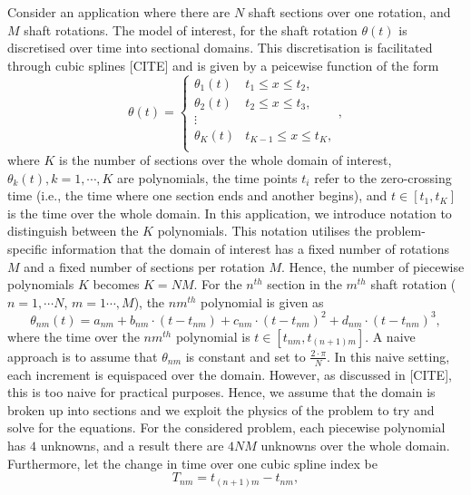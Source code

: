 \documentclass{article}
\begin{document}
	Consider an application where there are $N$ shaft sections over one rotation, and $M$ shaft rotations. The model of interest, for the shaft rotation $\theta(t)$ is discretised over time into sectional domains. This discretisation is facilitated through cubic splines [CITE] and is given by a peicewise function of the form
	\begin{equation}
		\theta(t) = \begin{cases} 
			\theta_{1}(t) &  t_{1} \leq x \leq t_2, \\
			\theta_{2}(t) &  t_{2} \leq x \leq t_3, \\
			\vdots \\
			\theta_{K}(t) &  t_{K-1} \leq x \leq t_K, \\
		\end{cases},
	\end{equation}
	where $K$ is the number of sections over the whole domain of interest, $\theta_{k}(t), k = 1, \cdots, K$ are polynomials, the time points $t_i$ refer to the zero-crossing time (i.e., the time where one section ends and another begins), and $t \in [t_1, t_K]$ is the time over the whole domain. In this application, we introduce notation to distinguish between the $K$ polynomials. This notation utilises the problem-specific information that the domain of interest has a fixed number of rotations $M$ and a fixed number of sections per rotation $M$. Hence, the number of piecewise polynomials $K$ becomes $K = NM$. For the $n^{th}$ section in the $m^{th}$ shaft rotation ($n = 1, \cdots N$, $m = 1 \cdots, M$), the $nm^{th}$ polynomial is given as
	\begin{equation}
		\theta_{nm}(t) = a_{nm} + b_{nm} \cdot \left(t - t_{nm} \right) + c_{nm} \cdot \left(t - t_{nm} \right)^2 + d_{nm} \cdot \left( t - t_{nm}\right)^3,
	\end{equation}
	where the time over the $nm^{th}$ polynomial is $t \in [t_{nm}, t_{(n + 1)m}]$. A naive approach is to assume that $\theta_{nm}$ is constant and set to $\frac{2\cdot\pi}{N}$. In this naive setting, each increment is equispaced over the domain. However, as discussed in [CITE], this is too naive for practical purposes. Hence, we assume that the domain is broken up into sections and we exploit the physics of the problem to try and solve for the equations. For the considered problem, each piecewise polynomial has $4$ unknowns, and a result there are $4NM$ unknowns over the whole domain. Furthermore, let the change in time over one cubic spline index be
	\begin{equation}
		T_{nm} = t_{(n + 1)m} - t_{nm},
	\end{equation}
\end{document}
